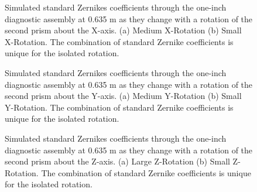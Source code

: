 \begin{figure}[H]	%
\begin{center}
\caption{\textmd{Simulated standard Zernikes coefficients through the one-inch diagnostic assembly at 0.635 \textmu m as they change with a rotation of the second prism about the X-axis. (a) Medium X-Rotation (b) Small X-Rotation. The combination of standard Zernike coefficients is unique for the isolated rotation.}}
\label{fig:XRotZernikes}
\end{center}
\end{figure}

\begin{figure}[H]	%
\begin{center}
\caption{\textmd{Simulated standard Zernikes coefficients through the one-inch diagnostic assembly at 0.635 \textmu m as they change with a rotation of the second prism about the Y-axis. (a) Medium Y-Rotation (b) Small Y-Rotation. The combination of standard Zernike coefficients is unique for the isolated rotation.}}
\label{fig:YRotZernikes}
\end{center}
\end{figure}

\begin{figure}[H]	%
\begin{center}
\caption{\textmd{Simulated standard Zernikes coefficients through the one-inch diagnostic assembly at 0.635 \textmu m as they change with a rotation of the second prism about the Z-axis. (a) Large Z-Rotation (b) Small Z-Rotation. The combination of standard Zernike coefficients is unique for the isolated rotation.}}
\label{fig:ZRotZernikes}
\end{center}
\end{figure}

